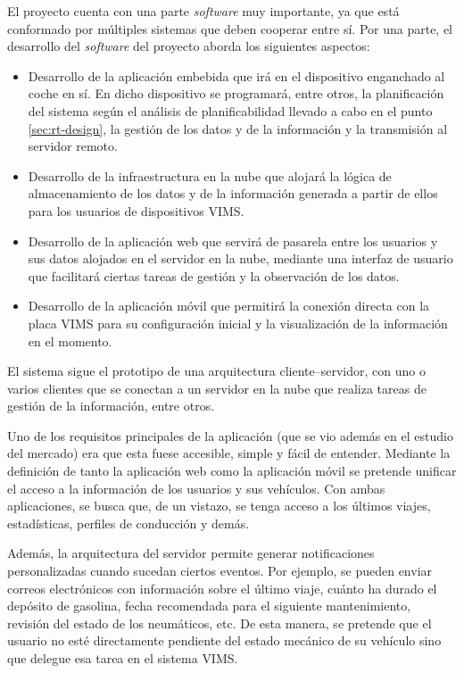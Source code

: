 El proyecto cuenta con una parte \textit{software} muy importante, ya que está
conformado por múltiples sistemas que deben cooperar entre sí. Por una parte,
el desarrollo del \textit{software} del proyecto aborda los siguientes aspectos:

\begin{itemize}
  \item Desarrollo de la aplicación embebida que irá en el dispositivo enganchado
        al coche en sí. En dicho dispositivo se programará, entre otros, la planificación
        del sistema según el análisis de planificabilidad llevado a cabo en el punto
        \ref{sec:rt-design}, la gestión de los datos y de la información y la transmisión
        al servidor remoto.
  \item Desarrollo de la infraestructura en la nube que alojará la lógica de almacenamiento de
        los datos y de la información generada a partir de ellos para los usuarios de
        dispositivos \ac{VIMS}.
  \item Desarrollo de la aplicación web que servirá de pasarela entre los usuarios
        y sus datos alojados en el servidor en la nube, mediante una interfaz de usuario
        que facilitará ciertas tareas de gestión y la observación de los datos.
  \item Desarrollo de la aplicación móvil que permitirá la conexión directa con la
        placa \ac{VIMS} para su configuración inicial y la visualización de la información
        en el momento.
\end{itemize}

El sistema sigue el prototipo de una arquitectura cliente--servidor, con uno o varios
clientes que se conectan a un servidor en la nube que realiza tareas de gestión de
la información, entre otros.

Uno de los requisitos principales de la aplicación (que se vio además en el estudio
del mercado) era que esta fuese accesible, simple y fácil de entender. Mediante la
definición de tanto la aplicación web como la aplicación móvil se pretende unificar
el acceso a la información de los usuarios y sus vehículos. Con ambas aplicaciones,
se busca que, de un vistazo, se tenga acceso a los últimos viajes, estadísticas,
perfiles de conducción y demás.

Además, la arquitectura del servidor permite generar notificaciones personalizadas
cuando sucedan ciertos eventos. Por ejemplo, se pueden enviar correos electrónicos
con información sobre el último viaje, cuánto ha durado el depósito de gasolina, fecha
recomendada para el siguiente mantenimiento, revisión del estado de los neumáticos,
etc. De esta manera, se pretende que el usuario no esté directamente pendiente del
estado mecánico de su vehículo sino que delegue esa tarea en el sistema \ac{VIMS}.

